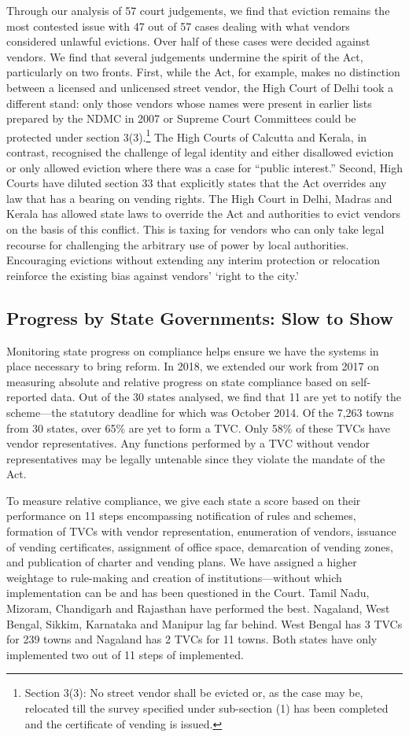 \documentclass[a4paper, 12pt, twoside]{article}
\begin{document}
{{Through our analysis of 57 court judgements, we find that eviction remains the most contested issue with 47 out of 57 cases dealing with what vendors considered unlawful evictions. Over half of these cases were decided against vendors. We find that several judgements undermine the spirit of the Act, particularly on two fronts. First, while the Act, for example, makes no distinction between a licensed and unlicensed street vendor, the High Court of Delhi took a different stand: only those vendors whose names were present in earlier lists prepared by the NDMC in 2007 or Supreme Court Committees could be protected under section 3(3).\footnote{ Section 3(3): No street vendor shall be evicted or, as the case may be, relocated till the survey specified under sub-section (1) has been completed and the certificate of vending is issued.} The High Courts of Calcutta and Kerala, in contrast, recognised the challenge of legal identity and either disallowed eviction or only allowed eviction where there was a case for “public interest.”  Second, High Courts have diluted section 33 that explicitly states that the Act overrides any law that has a bearing on vending rights. The High Court in Delhi, Madras and Kerala has allowed state laws to override the Act and authorities to evict vendors on the basis of this conflict. This is taxing for vendors who can only take legal recourse for challenging the arbitrary use of power by local authorities. Encouraging evictions without extending any interim protection or relocation reinforce the existing bias against vendors’ ‘right to the city.’

\subsection*{Progress by State Governments: Slow to Show}
Monitoring state progress on compliance helps ensure we have the systems in place necessary to bring reform. In 2018, we extended our work from 2017 on measuring absolute and relative progress on state compliance based on self-reported data. Out of the 30 states analysed, we find that 11 are yet to notify the scheme—the statutory deadline for which was October 2014. Of the 7,263 towns from 30 states, over 65\% are yet to form a TVC. Only 58\% of these TVCs have vendor representatives. Any functions performed by a TVC without vendor representatives may be legally untenable since they violate the mandate of the Act.

To measure relative compliance, we give each state a score based on their performance on 11 steps encompassing notification of rules and schemes, formation of TVCs with vendor representation, enumeration of vendors, issuance of vending certificates, assignment of office space, demarcation of vending zones, and publication of charter and vending plans. We have assigned a higher weightage to rule-making and creation of institutions—without which implementation can be and has been questioned in the Court. Tamil Nadu, Mizoram, Chandigarh and Rajasthan have performed the best. Nagaland, West Bengal, Sikkim, Karnataka and Manipur lag far behind. West Bengal has 3 TVCs for 239 towns and Nagaland has 2 TVCs for 11 towns. Both states have only implemented two out of 11 steps of implemented.

}}
\end{document}
